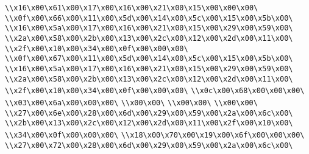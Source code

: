 \verb|\\x16\x00\x61\x00\x17\x00\x16\x00\x21\x00\x15\x00\x00\x00\|\newline
\verb|\\x0f\x00\x66\x00\x11\x00\x5d\x00\x14\x00\x5c\x00\x15\x00\x5b\x00\|\newline
\verb|\\x16\x00\x5a\x00\x17\x00\x16\x00\x21\x00\x15\x00\x29\x00\x59\x00\|\newline
\verb|\\x2a\x00\x58\x00\x2b\x00\x13\x00\x2c\x00\x12\x00\x2d\x00\x11\x00\|\newline
\verb|\\x2f\x00\x10\x00\x34\x00\x0f\x00\x00\x00\|\newline
\verb|\\x0f\x00\x67\x00\x11\x00\x5d\x00\x14\x00\x5c\x00\x15\x00\x5b\x00\|\newline
\verb|\\x16\x00\x5a\x00\x17\x00\x16\x00\x21\x00\x15\x00\x29\x00\x59\x00\|\newline
\verb|\\x2a\x00\x58\x00\x2b\x00\x13\x00\x2c\x00\x12\x00\x2d\x00\x11\x00\|\newline
\verb|\\x2f\x00\x10\x00\x34\x00\x0f\x00\x00\x00\|\newline
\verb|\\x0c\x00\x68\x00\x00\x00\|\newline
\verb|\\x03\x00\x6a\x00\x00\x00\|\newline
\verb|\\x00\x00\|\newline
\verb|\\x00\x00\|\newline
\verb|\\x00\x00\|\newline
\verb|\\x27\x00\x6e\x00\x28\x00\x6d\x00\x29\x00\x59\x00\x2a\x00\x6c\x00\|\newline
\verb|\\x2b\x00\x13\x00\x2c\x00\x12\x00\x2d\x00\x11\x00\x2f\x00\x10\x00\|\newline
\verb|\\x34\x00\x0f\x00\x00\x00\|\newline
\verb|\\x18\x00\x70\x00\x19\x00\x6f\x00\x00\x00\|\newline
\verb|\\x27\x00\x72\x00\x28\x00\x6d\x00\x29\x00\x59\x00\x2a\x00\x6c\x00\|\newline
